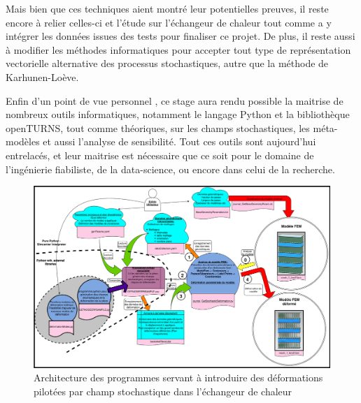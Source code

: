 \documentclass[a4paper,10pt]{article}
\begin{document}
Mais bien que ces techniques aient montré leur potentielles preuves, il reste encore à relier celles-ci et l'étude sur l'échangeur de chaleur tout comme a y intégrer les données issues des tests pour finaliser ce projet. De plus, il reste aussi à modifier les méthodes informatiques pour accepter tout type de représentation vectorielle alternative des processus stochastiques, autre que la méthode de Karhunen-Loève. \par \bigskip

Enfin d'un point de vue personnel , ce stage aura rendu possible la maitrise de nombreux outils informatiques, notamment le langage Python et la bibliothèque openTURNS, tout comme théoriques, sur les champs stochastiques, les méta-modèles et aussi l'analyse de sensibilité. Tout ces outils sont aujourd'hui entrelacés, et leur maitrise est nécessaire que ce soit pour le domaine de l'ingénierie fiabiliste, de la data-science, ou encore dans celui de la recherche. 

\newpage 



\appendix 
\appendixpage
\addappheadtotoc

\begin{figure}[H]
   \centering
   \vspace{-2cm}
   \includegraphics[angle=-90,origin=c,width=1.1\textwidth,height=1.1\textheight,keepaspectratio]{SchemaDeformationNastran.jpg}
      \caption{Architecture des programmes servant à introduire des déformations pilotées par champ stochastique dans l'échangeur de chaleur}
         \label{SchemaDeformationNastran}
\end{figure}
\end{document}

